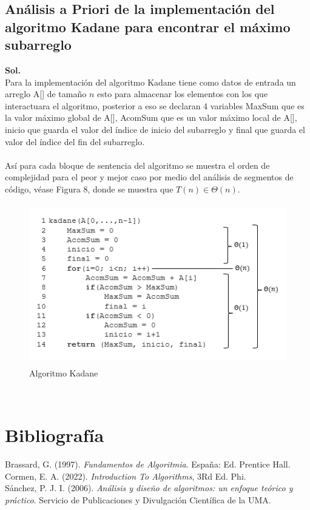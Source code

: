 \documentclass[12pt,twoside]{article}
\begin{document}
    \subsection{An\'alisis a Priori de la implementaci\'on del algoritmo Kadane para encontrar el máximo subarreglo}%
    \textbf{Sol.}\\
    Para la implementaci\'on del algoritmo Kadane tiene como datos de entrada un arreglo A[] de tama\~no $n$ esto para almacenar los elementos con los que interactuara el algoritmo, posterior a eso se declaran 4 variables MaxSum que es la valor m\'aximo global de A[], AcomSum que es un valor m\'aximo local de A[], inicio que guarda el valor del \'indice de inicio del subarreglo  y final que guarda el valor del \'indice del fin del subarreglo.\\
    \\
    As\'i para cada bloque de sentencia del algoritmo se muestra el orden de complejidad para el peor y mejor caso por medio del an\'alisis de segmentos de c\'odigo, v\'ease Figura 8, donde se muestra que $T(n)\in\Theta(n)$.\\
    \begin{figure}[h]
        \centering
        \includegraphics[height=7.0cm]{imagenes/A2.png}
        \caption{Algoritmo Kadane}
        \label{fig:my_label}
    \end{figure}
    \\
    \section{Bibliograf\'ia}
    Brassard, G. (1997). \textit {Fundamentos de Algoritmia}. España: Ed. Prentice Hall.\\[0.4cm]
    Cormen, E. A. (2022). \textit{Introduction To Algorithms}, 3Rd Ed. Phi.\\[0.4cm]
    S\'anchez, P. J. I. (2006). \textit{Análisis y diseño de algoritmos: un enfoque teórico y práctico}. Servicio de Publicaciones y Divulgación Científica de la UMA.
\end{document}

